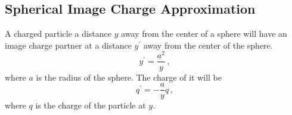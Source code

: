 \documentclass[a4paper,10pt]{article}
\numberwithin{equation}{section}
\newcommand{\ud}{\mathrm{d}}
\begin{document}
\subsection{Spherical Image Charge Approximation}
  A charged particle a distance \(y\) away from the center of a sphere will have an image charge partner at a distance \(y^\prime\) away from the center of the sphere.
  \begin{equation}
   y^\prime = \frac{a^2}{y}\, ,
  \end{equation}
  where \(a\) is the radius of the sphere. The charge of it will be
  \begin{equation}
   q^\prime = -\frac{a}{y}q\, ,
  \end{equation}
  where \(q\) is the charge of the particle at \(y\).
%
%
\end{document}
